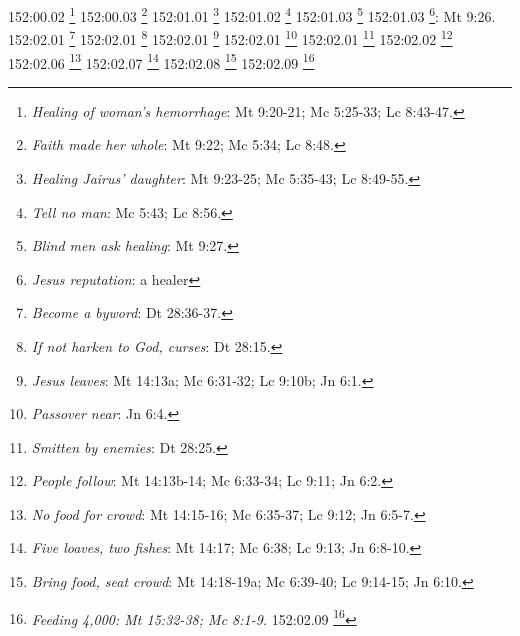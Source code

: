 {{{{{{{{{{{{{{{{{{{{{{{{{{{152:00.02 \footnote{\textit{Healing of woman's hemorrhage}: Mt 9:20-21; Mc 5:25-33; Lc 8:43-47.}
152:00.03 \footnote{\textit{Faith made her whole}: Mt 9:22; Mc 5:34; Lc 8:48.}
152:01.01 \footnote{\textit{Healing Jairus' daughter}: Mt 9:23-25; Mc 5:35-43; Lc 8:49-55.}
152:01.02 \footnote{\textit{Tell no man}: Mc 5:43; Lc 8:56.}
152:01.03 \footnote{\textit{Blind men ask healing}: Mt 9:27.}
152:01.03 \footnote{\textit{Jesus reputation}: a healer}: Mt 9:26.}
152:02.01 \footnote{\textit{Become a byword}: Dt 28:36-37.}
152:02.01 \footnote{\textit{If not harken to God, curses}: Dt 28:15.}
152:02.01 \footnote{\textit{Jesus leaves}: Mt 14:13a; Mc 6:31-32; Lc 9:10b; Jn 6:1.}
152:02.01 \footnote{\textit{Passover near}: Jn 6:4.}
152:02.01 \footnote{\textit{Smitten by enemies}: Dt 28:25.}
152:02.02 \footnote{\textit{People follow}: Mt 14:13b-14; Mc 6:33-34; Lc 9:11; Jn 6:2.}
152:02.06 \footnote{\textit{No food for crowd}: Mt 14:15-16; Mc 6:35-37; Lc 9:12; Jn 6:5-7.}
152:02.07 \footnote{\textit{Five loaves, two fishes}: Mt 14:17; Mc 6:38; Lc 9:13; Jn 6:8-10.}
152:02.08 \footnote{\textit{Bring food, seat crowd}: Mt 14:18-19a; Mc 6:39-40; Lc 9:14-15; Jn 6:10.}
152:02.09 \footnote{\textit{Feeding 4,000: Mt 15:32-38; Mc 8:1-9.}
152:02.09 \footnote{\textit{Feeding 5,000: Mt 14:19b-21; Mc 6:41-44; Lc 9:16-17; Jn 6:11-13.}
152:03.01 \footnote{\textit{"Here is our king.": Jn 6:14-15.}
152:03.02 \footnote{\textit{Father of lights}: Stg 1:17.}
152:03.02 \footnote{\textit{For wrong reasons}: Jn 6:26.}
152:03.02 \footnote{\textit{Kingdom not of this world}: Jn 18:36.}
152:03.03 \footnote{\textit{Mob leaves, Jesus prays}: Mt 14:23; Mc 6:46.}
152:04.01 \footnote{\textit{Disciples enter boat}: Mt 14:22; Mc 6:45; Jn 6:16-17a.}
152:04.02 \footnote{\textit{Jesus' "walk on water": Mt 14:24-31; Mc 6:47-51a; Jn 6:17b-21.}
152:05.01 \footnote{\textit{Arrive ashore}: Mt 14:34; Mc 6:53; Jn 6:22-25a.}
152:05.03 \footnote{\textit{Be patient, wait upon the Lord}: Sal 27:14.}
152:05.03 \footnote{\textit{Better to trust Lord than princes}: Sal 118:9.}
152:05.03 \footnote{\textit{Cast your burden on the Lord}: Sal 55:22.}
152:05.03 \footnote{\textit{Fear not, be still, see salvation}: Ex 14:13.}
152:05.03 \footnote{\textit{God dwells in the secret place}: Sal 91:1.}
152:05.03 \footnote{\textit{Put your trust in the Lord}: Sal 4:5.}
152:05.03 \footnote{\textit{Trust him at all times}: Sal 62:8.}
152:05.04 \footnote{\textit{Jesus discerns motives}: Jn 6:26-27.}
153:00.03 \footnote{\textit{Preaches in synagogue}: Jn 6:59.}
153:02.01 \footnote{\textit{Degradation predicted}: Dt 28:52-53.}
153:02.01 \footnote{\textit{Punishment spelled out}: Dt 28:45-50.}
}}}}}}}}}}}}}}}}}}}}}}}}}}}}}}
